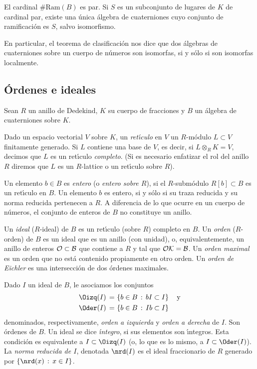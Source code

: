 \begin{teoClassificationSurUnCorpsGlobal}
 \label{thm:clasificacionglobal}
 El cardinal $\#\mathrm{Ram}(B)$ es par. Si $S$ es un subconjunto de lugares
 de $K$ de cardinal par, existe una \'{u}nica \'{a}lgebra de cuaterniones
 cuyo conjunto de ramificaci\'{o}n es $S$, salvo isomorfismo.
\end{teoClassificationSurUnCorpsGlobal}

En particular, el teorema de clasificaci\'{o}n nos dice que dos \'{a}lgebras
de cuaterniones sobre un cuerpo de n\'{u}meros son isomorfas, si y s\'{o}lo
si son isomorfas localmente.

\subsection{\'{O}rdenes e ideales}
Sean $R$ un anillo de Dedekind, $K$ su cuerpo de fracciones y $B$ un
\'{a}lgebra de cuaterniones sobre $K$.

Dado un espacio vectorial $V$ sobre $K$, un \emph{ret\'{\i}culo} en $V$
un $R$-m\'{o}dulo $L\subset V$ finitamente generado. Si $L$ contiene una
base de $V$, es decir, si $L\otimes_{R}K=V$, decimos que $L$ es un
ret\'{\i}culo \emph{completo}. (Si es necesario enfatizar el rol del anillo
$R$ diremos que $L$ es un $R$-lattice o un ret\'{\i}culo sobre $R$).

Un elemento $b\in B$ es \emph{entero} (o \emph{entero sobre $R$}),
si el $R$-subm\'{o}dulo $R[b]\subset B$ es un ret\'{\i}culo en $B$.
Un elemento $b$ es entero, si y s\'{o}lo si su traza reducida y su norma
reducida pertenecen a $R$. A diferencia de lo que ocurre en un cuerpo de
n\'{u}meros, el conjunto de enteros de $B$ no constituye un anillo.

Un \emph{ideal} ($R$-ideal) de $B$ es un ret\'{\i}culo (sobre $R$) completo
en $B$. Un \emph{orden} ($R$-orden) de $B$ es un ideal que es un anillo
(con unidad), o, equivalentemente, un anillo de enteros $\cal{O}\subset B$
que contiene a $R$ y tal que $\cal{O}K=B$. Un \emph{orden maximal} es un
orden que no est\'{a} contenido propiamente en otro orden. Un
\emph{orden de Eichler} es una intersecci\'{o}n de dos \'{o}rdenes maximales.

Dado $I$ un ideal de $B$, le asociamos los conjuntos
\begin{align*}
	\Oizq(I) \,=\, & \left\lbrace b\in B\,:\,bI\subset I\right\rbrace
	\quad\text{y}\\
	\Oder(I) \,=\, & \left\lbrace b\in B\,:\,Ib\subset I\right\rbrace
\end{align*}
%
denominados, respectivamente, \emph{orden a izquierda} y \emph{orden a derecha}
de $I$. Son \'{o}rdenes de $B$. Un ideal se dice \emph{\'{\i}ntegro}, si sus
elementos son \'{\i}ntegros. Esta condici\'{o}n es equivalente a
$I\subset\Oizq(I)$ (o, lo que es lo mismo, a $I\subset\Oder(I)$).
La \emph{norma reducida de $I$}, denotada $\nrd(I)$ es el ideal fraccionario
de $R$ generado por $\{\nrd(x)\,:\,x\in I\}$.


